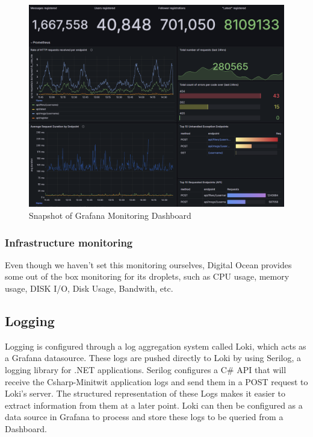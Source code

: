 \begin{figure}[H]
    \centering
    \includegraphics[height=0.9\textwidth]{images/Monitoring-latest.png}
    \caption{Snapshot of Grafana Monitoring Dashboard}
    \label{fig:grafana-dashboard}
\end{figure}

\subsubsection{Infrastructure monitoring}
Even though we haven't set this monitoring ourselves, Digital Ocean provides some out of the box monitoring for its droplets, such as CPU usage, memory usage, DISK I/O, Disk Usage, Bandwith, etc.

\subsection{Logging}
Logging is configured through a log aggregation system called Loki, which acts as a Grafana datasource. These logs are pushed directly to Loki by using Serilog, a logging library for .NET applications. Serilog configures a C\# API that will receive the Csharp-Minitwit application logs and send them in a POST request to Loki's server. The structured representation of these Logs makes it easier to extract information from them at a later point. Loki can then be configured as a data source in Grafana to process and store these logs to be queried from a Dashboard.

